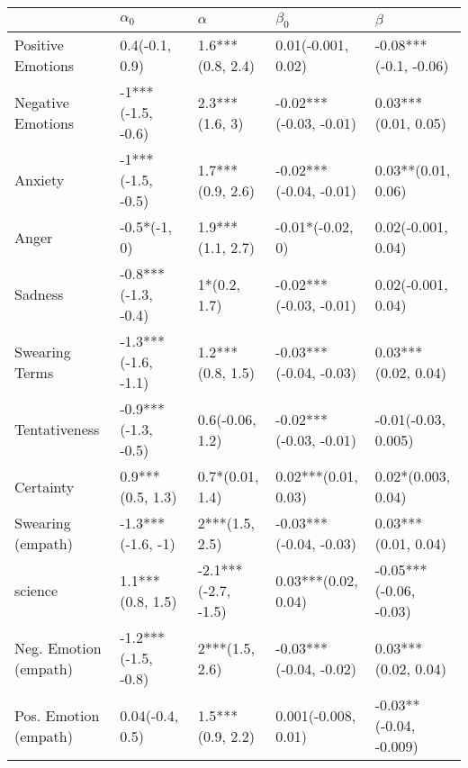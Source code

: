 \begin{tabular}{lllll}
\toprule
{} &           $\alpha_0$ &             $\alpha$ &               $\beta_0$ &                 $\beta$ \\
\midrule
Positive Emotions     &       0.4(-0.1, 0.9) &     1.6***(0.8, 2.4) &      0.01(-0.001, 0.02) &   -0.08***(-0.1, -0.06) \\
Negative Emotions     &    -1***(-1.5, -0.6) &       2.3***(1.6, 3) &  -0.02***(-0.03, -0.01) &     0.03***(0.01, 0.05) \\
Anxiety               &    -1***(-1.5, -0.5) &     1.7***(0.9, 2.6) &  -0.02***(-0.04, -0.01) &      0.03**(0.01, 0.06) \\
Anger                 &         -0.5*(-1, 0) &     1.9***(1.1, 2.7) &        -0.01*(-0.02, 0) &      0.02(-0.001, 0.04) \\
Sadness               &  -0.8***(-1.3, -0.4) &         1*(0.2, 1.7) &  -0.02***(-0.03, -0.01) &      0.02(-0.001, 0.04) \\
Swearing Terms        &  -1.3***(-1.6, -1.1) &     1.2***(0.8, 1.5) &  -0.03***(-0.04, -0.03) &     0.03***(0.02, 0.04) \\
Tentativeness         &  -0.9***(-1.3, -0.5) &      0.6(-0.06, 1.2) &  -0.02***(-0.03, -0.01) &     -0.01(-0.03, 0.005) \\
Certainty             &     0.9***(0.5, 1.3) &      0.7*(0.01, 1.4) &     0.02***(0.01, 0.03) &      0.02*(0.003, 0.04) \\
Swearing (empath)     &    -1.3***(-1.6, -1) &       2***(1.5, 2.5) &  -0.03***(-0.04, -0.03) &     0.03***(0.01, 0.04) \\
science               &     1.1***(0.8, 1.5) &  -2.1***(-2.7, -1.5) &     0.03***(0.02, 0.04) &  -0.05***(-0.06, -0.03) \\
Neg. Emotion (empath) &  -1.2***(-1.5, -0.8) &       2***(1.5, 2.6) &  -0.03***(-0.04, -0.02) &     0.03***(0.02, 0.04) \\
Pos. Emotion (empath) &      0.04(-0.4, 0.5) &     1.5***(0.9, 2.2) &     0.001(-0.008, 0.01) &  -0.03**(-0.04, -0.009) \\
\bottomrule
\end{tabular}
